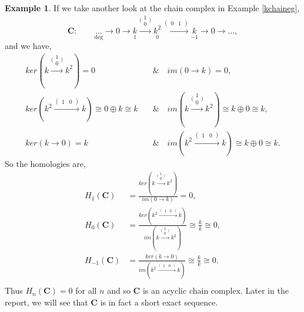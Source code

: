 \documentclass[11.5pt, twoside, a4paper, titlepage]{report}
\theoremstyle{definition}
\newtheorem{eg}[mydef]{Example}
\theoremstyle{plain}
\begin{document}
\begin{eg}
If we take another look at the chain complex in Example \ref{kchaineg},
\begin{equation*}
\mathbf{C}: \qquad \underset{\text{deg}}{\dots} \xrightarrow{} 0 \xrightarrow{} \underset{1}{k} \xrightarrow{\big(\begin{smallmatrix} 1\\ 0 \end{smallmatrix}\big)} \underset{0}{k^2} \xrightarrow{(\begin{smallmatrix}0 & 1 \end{smallmatrix})}\underset{-1}{k} \xrightarrow{} 0 \xrightarrow{} \dots,
\end{equation*}
and we have, 
\begin{align*}
ker(k\xrightarrow{\big(\begin{smallmatrix} 1\\ 0 \end{smallmatrix}\big)}k^2)=0 \quad &\& \quad im(0 \xrightarrow{}k)=0,\\
ker(k^2\xrightarrow{(\begin{smallmatrix} 1 & 0 \end{smallmatrix})}k) \cong 0\oplus k \cong k \quad &\& \quad im(k\xrightarrow{\big(\begin{smallmatrix} 1\\ 0 \end{smallmatrix}\big)}k^2)\cong k \oplus 0\cong k,\\
ker(k\xrightarrow{}0)=k \quad &\& \quad im(k^2\xrightarrow{(\begin{smallmatrix} 1 & 0 \end{smallmatrix})}k)\cong k \oplus 0 \cong k.
\end{align*}
So the homologies are, 
\begin{align*}
H_1(\mathbf{C}) &=\frac{ker(k\xrightarrow{\big(\begin{smallmatrix} 1\\ 0 \end{smallmatrix}\big)}k^2)}{im(0 \xrightarrow{}k)}= 0,\\
H_0(\mathbf{C}) &=\frac{ker(k^2\xrightarrow{(\begin{smallmatrix} 1 & 0 \end{smallmatrix})}k)}{im(k\xrightarrow{\big(\begin{smallmatrix} 1\\ 0 \end{smallmatrix}\big)}k^2)}\cong \frac{k}{k} \cong 0,\\
H_{-1}(\mathbf{C}) &=\frac{ker(k\xrightarrow{}0)}{im(k^2\xrightarrow{(\begin{smallmatrix} 1 & 0 \end{smallmatrix})}k)}\cong \frac{k}{k} \cong 0.\\
\end{align*}
Thus $H_n(\mathbf{C})=0$ for all $n$ and so $\mathbf{C}$ is an acyclic chain complex. Later in the report, we will see that $\mathbf{C}$ is in fact a short exact sequence.
\end{eg}
\end{document}
